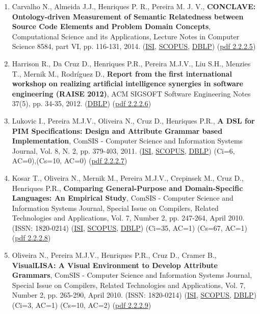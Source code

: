 \documentclass[11pt]{article}
\begin{document}
\begin{enumerate}
\item{ Carvalho N., Almeida J.J., Henriques P. R., Pereira M. J. V., {\bf{ CONCLAVE: Ontology-driven Measurement of Semantic Relatedness between Source Code Elements and Problem Domain Concepts}}, Computational Science and its Applications, Lecture Notes in Computer Science  8584, part VI, pp. 116-131, 2014. (\href{run:Publicacoes/ComprovativosISI.pdf}{ISI}, \href{run:Publicacoes/PublicacoesSCOPUS.pdf}{SCOPUS}, \href{run:Publicacoes/ComprovativosDBLP.pdf}{DBLP}) (\href{run:Publicacoes/publicacoes/74.pdf}{pdf 2.2.2.5})}
\item{ Harrison R., Da Cruz D., Henriques P.R., Pereira M.J.V., Liu S.H., Menzies T., Mernik M., Rodríguez D., {\bf{ Report from the first international workshop on realizing artificial intelligence synergies in software engineering (RAISE 2012)}}, ACM SIGSOFT Software Engineering Notes 37(5), pp. 34-35, 2012. (\href{run:Publicacoes/ComprovativosDBLP.pdf}{DBLP}) (\href{run:Publicacoes/RAISE2012.pdf}{pdf 2.2.2.6})}
\item{ Lukovic I., Pereira M.J.V., Oliveira N., Cruz D., Henriques P.R., {\bf{ A DSL for PIM Specifications: Design and Attribute Grammar based Implementation}}, ComSIS - Computer Science and Information Systems Journal, Vol. 8, N. 2, pp. 379-403, 2011. (\href{run:Publicacoes/ComprovativosISI.pdf}{ISI}, \href{run:Publicacoes/PublicacoesSCOPUS.pdf}{SCOPUS}, \href{run:Publicacoes/ComprovativosDBLP.pdf}{DBLP}) (Ci=6, AC=0),(Cs=10, AC=0) (\href{run:Publicacoes/publicacoes/55.pdf}{pdf 2.2.2.7})}
\item{ Kosar T., Oliveira N., Mernik M., Pereira M.J.V., Crepinsek M., Cruz D., Henriques P.R., {\bf{ Comparing General-Purpose and Domain-Specific Languages: An Empirical Study}}, ComSIS - Computer Science and Information Systems Journal, Special Issue on Compilers, Related Technologies and Applications, Vol. 7, Number 2, pp. 247-264, April 2010. (ISSN: 1820-0214) (\href{run:Publicacoes/ComprovativosISI.pdf}{ISI}, \href{run:Publicacoes/PublicacoesSCOPUS.pdf}{SCOPUS}, \href{run:Publicacoes/ComprovativosDBLP.pdf}{DBLP}) (Ci=35, AC=1) (Cs=67, AC=1) (\href{run:Publicacoes/publicacoes/49.pdf}{pdf 2.2.2.8})}
\item{ Oliveira N., Pereira M.J.V., Henriques P.R., Cruz D., Cramer B., {\bf{ VisualLISA: A Visual Environment to Develop Attribute Grammars}}, ComSIS - Computer Science and Information Systems Journal, Special Issue on Compilers, Related Technologies and Applications, Vol. 7, Number 2, pp. 265-290, April 2010. (ISSN: 1820-0214) (\href{run:Publicacoes/ComprovativosISI.pdf}{ISI}, \href{run:Publicacoes/PublicacoesSCOPUS.pdf}{SCOPUS}, \href{run:Publicacoes/ComprovativosDBLP.pdf}{DBLP}) (Ci=3, AC=1) (Cs=10, AC=2) (\href{run:Publicacoes/publicacoes/52.pdf}{pdf 2.2.2.9})}

\end{enumerate}
\end{document}
